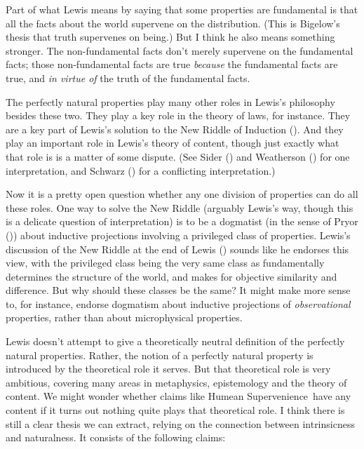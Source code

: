 \documentclass[
  11pt,
  letterpaper,
  DIV=11,
  numbers=noendperiod,
  twoside]{scrartcl}
\begin{document}
Part of what Lewis means by saying that some properties are fundamental
is that all the facts about the world supervene on the distribution.
(This is Bigelow's thesis that truth supervenes on being.) But I think
he also means something stronger. The non-fundamental facts don't merely
supervene on the fundamental facts; those non-fundamental facts are true
\emph{because} the fundamental facts are true, and \emph{in virtue of}
the truth of the fundamental facts.

The perfectly natural properties play many other roles in Lewis's
philosophy besides these two. They play a key role in the theory of
laws, for instance. They are a key part of Lewis's solution to the New
Riddle of Induction (). And they
play an important role in Lewis's theory of content, though just exactly
what that role is is a matter of some dispute. (See Sider
() and Weatherson
() for one interpretation, and
Schwarz () for a conflicting
interpretation.)

Now it is a pretty open question whether any one division of properties
can do all these roles. One way to solve the New Riddle (arguably
Lewis's way, though this is a delicate question of interpretation) is to
be a dogmatist (in the sense of Pryor ())
about inductive projections involving a privileged class of properties.
Lewis's discussion of the New Riddle at the end of Lewis
() sounds like he endorses this view,
with the privileged class being the very same class as fundamentally
determines the structure of the world, and makes for objective
similarity and difference. But why should these classes be the same? It
might make more sense to, for instance, endorse dogmatism about
inductive projections of \emph{observational} properties, rather than
about microphysical properties.

Lewis doesn't attempt to give a theoretically neutral definition of the
perfectly natural properties. Rather, the notion of a perfectly natural
property is introduced by the theoretical role it serves. But that
theoretical role is very ambitious, covering many areas in metaphysics,
epistemology and the theory of content. We might wonder whether claims
like Humean Supervenience~have any content if it turns out nothing quite
plays that theoretical role. I think there is still a clear thesis we
can extract, relying on the connection between intrinsicness and
naturalness. It consists of the following claims:
\end{document}
